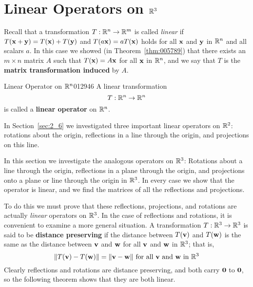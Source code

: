 \section{Linear Operators on $\mathbb{R}^3$}
\label{sec:4_4}

Recall that a transformation $T : \mathbb{R}^n \to \mathbb{R}^m$ is called \textit{linear} if $T(\textbf{x} + \textbf{y}) = T(\textbf{x}) + T(\textbf{y})$ and $T(a\textbf{x}) = aT(\textbf{x})$ holds for all $\textbf{x}$ and $\textbf{y}$ in $\mathbb{R}^n$ and all scalars $a$. In this case we showed (in Theorem~\ref{thm:005789}) that there exists an $m \times n$ matrix $A$ such that $T(\textbf{x}) = A\textbf{x}$ for all $\textbf{x}$ in $\mathbb{R}^n$, and we say that $T$ is the \textbf{matrix transformation induced} by $A$.


\begin{definition}{Linear Operator on $\mathbb{R}^n$}{012946}
A linear transformation
\begin{equation*}
T: \mathbb{R}^n \to \mathbb{R}^n
\end{equation*}
is called a \textbf{linear operator} on $\mathbb{R}^n$.
\end{definition}


\noindent In Section~\ref{sec:2_6} we investigated three important linear operators on $\mathbb{R}^2$: rotations about the origin, reflections in a line through the origin, and projections on this line.


In this section we investigate the analogous operators on $\mathbb{R}^3$:
 Rotations about a line through the origin, reflections in a plane 
through the origin, and projections onto a plane or line through the 
origin in $\mathbb{R}^3$. In every case we show that the operator is linear, and we find the matrices of all the reflections and projections.


To do this we must prove that these reflections, projections, and rotations are actually \textit{linear} operators on $\mathbb{R}^3$. In the case of reflections and rotations, it is convenient to examine a more general situation. A transformation $T : \mathbb{R}^3 \to \mathbb{R}^3$ is said to be \textbf{distance preserving} if the distance between $T(\textbf{v})$ and $T(\textbf{w})$ is the same as the distance between $\textbf{v}$ and $\textbf{w}$ for all $\textbf{v}$ and $\textbf{w}$ in $\mathbb{R}^3$; that is,
\begin{equation}\label{eq:distancePresEq}
\| T(\textbf{v}) - T(\textbf{w}) \| = \| \textbf{v} - \textbf{w} \| \mbox{ for all } \textbf{v} \mbox{ and } \textbf{w} \mbox{ in } \mathbb{R}^3
\end{equation}
Clearly reflections and rotations are distance preserving, and both carry $\textbf{0}$ to $\textbf{0}$, so the following theorem shows that they are both linear.


